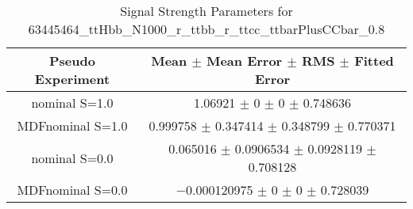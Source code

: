 \begin{table}
\centering
\caption{Signal Strength Parameters for 63445464\_ttHbb\_N1000\_r\_ttbb\_r\_ttcc\_ttbarPlusCCbar\_0.8}
\begin{tabular}{cc}
\toprule
Pseudo Experiment & Mean $\pm$ Mean Error $\pm$ RMS $\pm$ Fitted Error\\
\midrule
nominal S=1.0 & \num{1.06921} $\pm$ \num{0} $\pm$ \num{0} $\pm$ \num{0.748636}\\
MDFnominal S=1.0 & \num{0.999758} $\pm$ \num{0.347414} $\pm$ \num{0.348799} $\pm$ \num{0.770371}\\
nominal S=0.0 & \num{0.065016} $\pm$ \num{0.0906534} $\pm$ \num{0.0928119} $\pm$ \num{0.708128}\\
MDFnominal S=0.0 & \num{-0.000120975} $\pm$ \num{0} $\pm$ \num{0} $\pm$ \num{0.728039}\\
\bottomrule
\end{tabular}
\end{table}